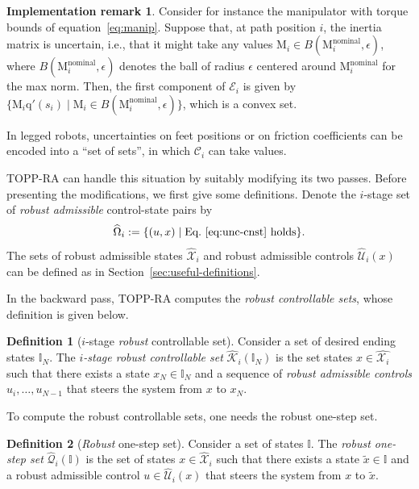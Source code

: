 \documentclass[journal]{IEEEtran}
\theoremstyle{plain}
\theoremstyle{definition}
\newtheorem{definition2}{Definition}
\newenvironment{definition}
  {\renewcommand{\qedsymbol}{$\lozenge$}
   \pushQED{\qed}\begin{definition2}}
  {\popQED\end{definition2}}
\theoremstyle{definition}
\newtheorem{remark2}{Implementation remark}
\newenvironment{remark}
  {\renewcommand{\qedsymbol}{$\lozenge$}%
   \pushQED{\qed}\begin{remark2}}
  {\popQED\end{remark2}}
\renewcommand{\vec}[1]{\bm{\mathrm{#1}}}  %
\newcommand{\cC}{\mathscr{C}}
\newcommand{\calX}{\mathcal{X}}
\newcommand{\calU}{\mathcal{U}}
\newcommand{\bbI}{\mathbb{I}}
\newcommand{\calQ}{\mathcal{Q}}
\newcommand{\calE}{\mathcal{E}}
\begin{document}
\begin{remark}
  Consider for instance the manipulator with torque bounds of
  equation~\eqref{eq:manip}. Suppose that, at path position $i$, the
  inertia matrix is uncertain, i.e., that it might take any values
  $\vec M_i \in B(\vec M^\textrm{nominal}_i,\epsilon)$, where
  $B(\vec M^\textrm{nominal}_i,\epsilon)$ denotes the ball of radius
  $\epsilon$ centered around $\vec M^\textrm{nominal}_i$ for the max
  norm. Then, the first component of $\calE_i$ is given by
  $\{\vec M_i\vec q'(s_i) \mid \vec M_i \in B(\vec
  M^\textrm{nominal}_i,\epsilon)\}$,
  which is a convex set.

  In legged robots, uncertainties on feet positions or on friction
  coefficients can be encoded into a ``set of sets'', in which $\cC_i$
  can take values.  
\end{remark}

TOPP-RA can handle this situation by suitably modifying its two
passes. Before presenting the modifications, we first give some
definitions.  Denote the $i$-stage set of \emph{robust admissible}
control-state pairs by
\begin{equation*}
  \widehat{\Omega}_{i} := \{(u,x) \mid \textrm{Eq.~\eqref{eq:unc-cnst} holds}\}.
\end{equation*}
The sets of robust admissible states $\widehat{\calX}_i$ and robust
admissible controls $\widehat{\calU}_i(x)$ can be defined as in
Section~\ref{sec:useful-definitions}.

In the backward pass, TOPP-RA computes the \emph{robust controllable
  sets}, whose definition is given below. 


\begin{definition}[$i$-stage \emph{robust} controllable set]
  Consider a set of desired ending states $\bbI_N$. The
  \emph{$i$-stage robust controllable set}
  $\widehat{\mathcal{K}}_i(\bbI_N)$ is the set states
  $x\in\widehat{\calX_i}$ such that there exists a state
  $x_N\in \bbI_N$ and a sequence of \emph{robust admissible controls}
  $u_i,\dots, u_{N-1}$ that steers the system from $x$ to $x_{N}$.
\end{definition}

To compute the robust controllable sets, one needs the robust
one-step set.

\begin{definition}[\emph{Robust} one-step set]
  Consider a set of states $\bbI$. The \emph{robust one-step set}
  $\widehat{\calQ}_i(\bbI)$ is the set of states
  $x\in\widehat{\calX}_{i}$ such that there exists a state
  $\tilde{x}\in\bbI$ and a robust admissible control
  $u\in\widehat{\calU}_i(x)$ that steers the system from $x$ to
  $\tilde{x}$.
\end{definition}
\end{document}
